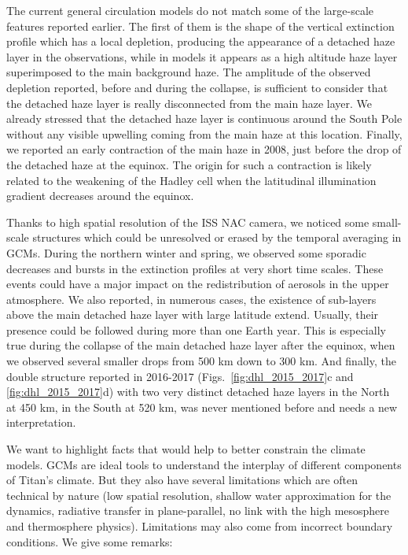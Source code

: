 The current general circulation models do not match some of the large-scale features reported earlier. The first of them
is the shape of the vertical extinction profile which has a local depletion, producing the appearance of a detached haze layer in the
observations, while in models it appears as a high altitude haze layer superimposed to the main background haze.
The amplitude of the observed depletion reported, before and during the collapse, is sufficient to consider that the
detached haze layer is really disconnected from the main haze layer. We already stressed that the detached haze layer is
continuous around the South Pole without any visible upwelling coming from the main haze at this location. Finally, we
reported an early contraction of the main haze in 2008, just before the drop of the detached haze at the equinox. The origin
for such a contraction is likely related to the weakening of the Hadley cell when the latitudinal illumination gradient
decreases around the equinox.

Thanks to high spatial resolution of the ISS NAC camera, we noticed some small-scale structures which could be unresolved or
erased by the temporal averaging in GCMs. During the northern winter and spring, we observed some sporadic decreases and
bursts in the extinction profiles at very short time scales. These events could have a major impact on the redistribution of
aerosols in the upper atmosphere. We also reported, in numerous cases, the existence of sub-layers above the main detached
haze layer with large latitude extend. Usually, their presence could be followed during more than one Earth year. This is
especially true during the collapse of the main detached haze layer after the equinox, when we observed several smaller
drops from 500 km down to 300 km. And finally, the double structure reported in 2016-2017
(Figs.~\ref{fig:dhl_2015_2017}c and \ref{fig:dhl_2015_2017}d) with two very distinct detached haze layers in the
North at 450 km, in the South at 520 km, was never mentioned before and needs a new interpretation.

We want to highlight facts that would help to better constrain the climate models.
GCMs are ideal tools to understand the interplay of different components of Titan's climate.
But they also have several limitations which are often technical by nature (low spatial resolution, shallow water
approximation for the dynamics, radiative transfer in plane-parallel, no link with the high mesosphere and thermosphere physics).
Limitations may also come from incorrect boundary conditions. We give some remarks:

